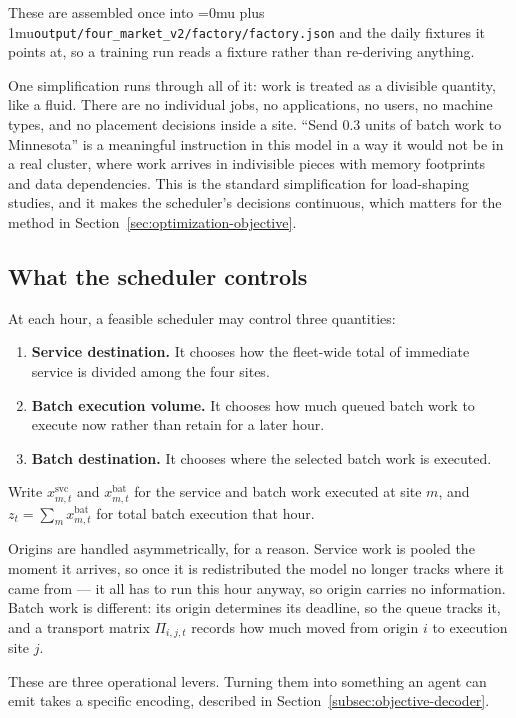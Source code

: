 ﻿\documentclass[12pt]{article}
\newcommand{\codepath}[1]{{\Urlmuskip=0mu plus 1mu\relax\nolinkurl{#1}}}
\begin{document}
These are assembled once into
\codepath{output/four_market_v2/factory/factory.json} and the daily fixtures it
points at, so a training run reads a fixture rather than re-deriving anything.

One simplification runs through all of it: work is treated as a divisible
quantity, like a fluid. There are no individual jobs, no applications, no users,
no machine types, and no placement decisions inside a site. ``Send 0.3 units of
batch work to Minnesota'' is a meaningful instruction in this model in a way it
would not be in a real cluster, where work arrives in indivisible pieces with
memory footprints and data dependencies. This is the standard simplification for
load-shaping studies, and it makes the scheduler's decisions continuous, which
matters for the method in Section~\ref{sec:optimization-objective}.

\subsection{What the scheduler controls}
\label{subsec:problem-decisions}

At each hour, a feasible scheduler may control three quantities:
\begin{enumerate}
  \item \textbf{Service destination.} It chooses how the fleet-wide total of
        immediate service is divided among the four sites.
  \item \textbf{Batch execution volume.} It chooses how much queued batch work
        to execute now rather than retain for a later hour.
  \item \textbf{Batch destination.} It chooses where the selected batch work is
        executed.
\end{enumerate}

Write \(x^{\mathrm{svc}}_{m,t}\) and \(x^{\mathrm{bat}}_{m,t}\) for the service
and batch work executed at site \(m\), and \(z_t=\sum_m x^{\mathrm{bat}}_{m,t}\)
for total batch execution that hour.

Origins are handled asymmetrically, for a reason. Service work is pooled the
moment it arrives, so once it is redistributed the model no longer tracks where
it came from --- it all has to run this hour anyway, so origin carries no
information. Batch work is different: its origin determines its deadline, so
the queue tracks it, and a transport matrix \(\Pi_{i,j,t}\) records how much
moved from origin \(i\) to execution site \(j\).

These are three operational levers. Turning them into something an agent can
emit takes a specific encoding, described in
Section~\ref{subsec:objective-decoder}.
\end{document}
